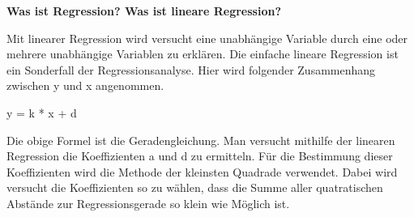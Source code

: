 \textbf{Was ist Regression? Was ist lineare Regression?}

Mit linearer Regression wird versucht eine unabhängige Variable durch eine oder mehrere unabhängige Variablen zu erklären. Die einfache lineare Regression ist ein Sonderfall der Regressionsanalyse. Hier wird folgender Zusammenhang zwischen y und x angenommen.

y = k * x + d

Die obige Formel ist die Geradengleichung. Man versucht mithilfe der linearen Regression die Koeffizienten a und d zu ermitteln. Für die Bestimmung dieser Koeffizienten wird die Methode der kleinsten Quadrade verwendet. Dabei wird versucht die Koeffizienten so zu wählen, dass die  Summe aller quatratischen Abstände zur Regressionsgerade so klein wie Möglich ist.  
